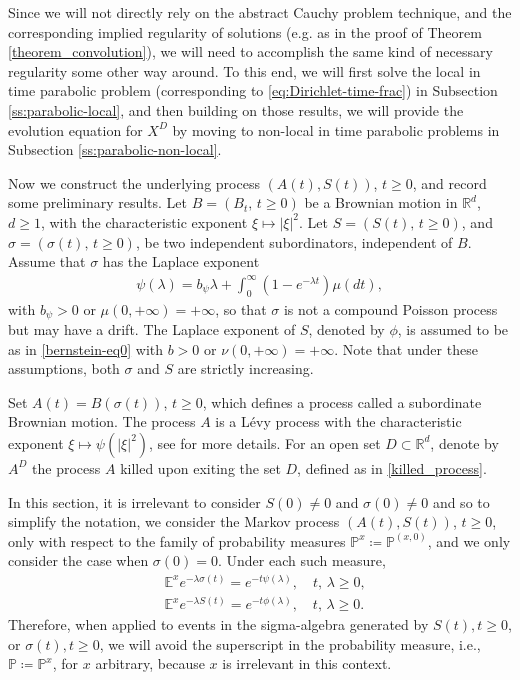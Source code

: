 \documentclass[reqno]{amsart}
\theoremstyle{remark}
\numberwithin{equation}{section} %
\newcommand{\1}{\mathds{1}}
\begin{document}
	Since we will not directly rely on the abstract Cauchy problem technique, and the corresponding implied regularity of solutions  (e.g. as in the proof of Theorem \ref{theorem_convolution}), we will need to accomplish the same kind of necessary regularity some other way around. To this end, we will first solve the local in time parabolic problem (corresponding to \eqref{eq:Dirichlet-time-frac}) in Subsection \ref{ss:parabolic-local}, and then building on those results, we will provide the evolution equation for $X^D$ by moving to non-local in time parabolic problems in Subsection \ref{ss:parabolic-non-local}.
	
	
	
	Now we construct the underlying process $(A(t),S(t))$, $t\ge0$, and record some preliminary results. Let $B=(B_t,\, t \geq 0)$ be a Brownian motion in $\mathbb{R}^d$, $d\ge 1$, with the characteristic exponent $\xi\mapsto |\xi|^2$. Let $S=(S(t),\,t \geq 0)$, and $\sigma=(\sigma(t),\,t \geq 0)$, be two independent subordinators, independent of $B$. Assume that $\sigma$ has the Laplace exponent 
	\begin{align}\label{eq:psi Laplace defn}
		\psi(\lambda)=b_\psi\lambda+\int_0^\infty(1-e^{-\lambda t})\mu(dt),
	\end{align}
	with $b_\psi>0$ or $\mu(0,+\infty)=+\infty$, so that  $\sigma$ is not a compound Poisson process but may have a drift. The Laplace exponent of  $S$, denoted by $\phi$, is assumed to be as in \eqref{bernstein-eq0} with $b>0$ or $\nu(0,+\infty)=+\infty$. Note that under these assumptions, both $\sigma$ and $S$ are strictly increasing.
	
	Set $A(t) =  B (\sigma(t))$, $t \geq 0$, which defines a process called a subordinate Brownian motion. The process $A$ is a L\'evy process with the characteristic exponent $\xi\mapsto\psi(|\xi|^2)$, see \cite{sato} for more details. For an open set $D\subset \mathbb{R}^d$, denote by $A^D$ the process $A$ killed upon exiting the set $D$, defined as in \eqref{killed_process}.
	
	In this section, it is irrelevant to consider $S(0) \neq 0$ and $\sigma(0) \neq 0$ and so to simplify the notation, we consider the Markov process $(A(t), S(t))$, $t\ge0$, only with respect to the family of probability measures $\mathds{P}^{x} \coloneqq \mathds{P}^{(x,0)}$, and we only consider the case when $\sigma(0)=0$. Under each such measure,
	\begin{align}
		& \mathds{E}^x e^{-\lambda \sigma (t)} = e^{-t \psi (\lambda)},\quad t,\,\lambda\ge0,\\
		&  \mathds{E}^x e^{-\lambda S (t)} = e^{-t \phi (\lambda)},\quad t,\,\lambda\ge0. 
	\end{align}
	Therefore, when applied to events in the sigma-algebra generated by $S(t), t \geq 0$, or $\sigma(t), t \geq 0$, we will avoid the superscript in the probability measure, i.e.,  $\mathds{P} \coloneqq \mathds{P}^x$, for $x$ arbitrary, because $x$ is irrelevant in this context.
	
\end{document}
